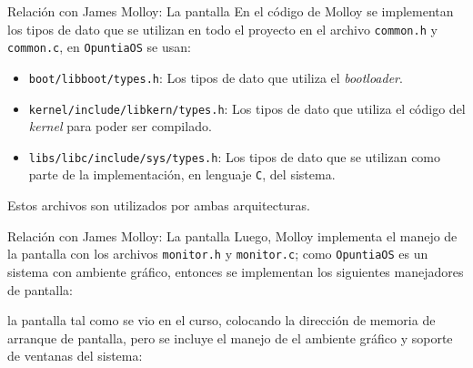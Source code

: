 \begin{frame}{Relación con James Molloy: La pantalla}
	En el código de Molloy se implementan los tipos de dato que se utilizan en todo el proyecto en el archivo \texttt{common.h} y \texttt{common.c}, en \texttt{OpuntiaOS} se usan:
	\begin{itemize} \setlength\itemsep{0pt} \footnotesize
		\item \texttt{boot/libboot/types.h}: Los tipos de dato que utiliza el \textit{bootloader}.
		
		\item \texttt{kernel/include/libkern/types.h}: Los tipos de dato que utiliza el código del \textit{kernel} para poder ser compilado.
		
		\item \texttt{libs/libc/include/sys/types.h}: Los tipos de dato que se utilizan como parte de la implementación, en lenguaje \texttt{C}, del sistema.
	\end{itemize}
	
	Estos archivos son utilizados por ambas arquitecturas.
\end{frame}

\begin{frame}{Relación con James Molloy: La pantalla}
	Luego, Molloy implementa el manejo de la pantalla con los archivos \texttt{monitor.h} y \texttt{monitor.c}; como \texttt{OpuntiaOS} es un sistema con ambiente gráfico, entonces se implementan los siguientes manejadores de pantalla:
	
	la pantalla tal como se vio en el curso, colocando la dirección de memoria de arranque de pantalla, pero se incluye el manejo de el ambiente gráfico y soporte de ventanas del sistema:
	
\end{frame}

